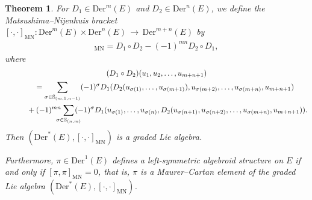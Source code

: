 \documentclass[pdftex]{sigma}%
\numberwithin{equation}{section}
\newtheorem{thm}{Theorem}[section]
\newcommand{\lon }{\,\rightarrow\,}
\newcommand{\Der}{\mathrm{Der}}
\newcommand{\MN}{\mathrm{MN}}
\begin{document}
\begin{thm}\label{thm:graded-one}
 For $D_1\in \Der^m(E)$ and $D_2\in \Der^n(E)$, we define the Matsushima--Nijenhuis bracket $ [\cdot,\cdot]_{\MN}\colon \Der^m(E)\times \Der^n(E)\lon \Der^{m+n}(E)$ by
 \begin{gather*}%
 [D_1,D_2]_{\MN}=D_1\circ D_2-(-1)^{mn}D_2\circ D_1,
 \end{gather*}
 where
 \begin{gather*}
(D_1\circ D_2)(u_1,u_2,\dots,u_{m+n+1})
\\ \qquad
{}=\sum_{\sigma\in \mathbb{S}_{(m,1,n-1)}}(-1)^{\sigma}D_1 (D_2(u_{\sigma(1)},\dots,u_{\sigma(m+1)}),u_{\sigma(m+2)},\dots,u_{\sigma(m+n)},u_{m+n+1})
\\ \qquad\hphantom{=}
{}+(-1)^{mn}\!\!\!\!\!\sum_{\sigma\in \mathbb{S}_{(n,m)}}\!\!\!\!\!(-1)^{\sigma}D_1
(u_{\sigma(1)},\dots,u_{\sigma(n)},D_2(u_{\sigma(n+1)},u_{\sigma(n+2)},\dots,u_{\sigma(m+n)},u_{m+n+1})).
\end{gather*}
Then $(\Der^*(E),[\cdot,\cdot]_{\MN})$ is a graded Lie algebra.

Furthermore, $\pi\in\Der^1(E)$ defines a left-symmetric algebroid structure on $E$ if and only if $[\pi,\pi]_{\MN}=0$, that is, $\pi$ is a Maurer--Cartan element of the graded Lie algebra $(\Der^*(E),[\cdot,\cdot]_{\MN})$.
\end{thm}
\end{document}
